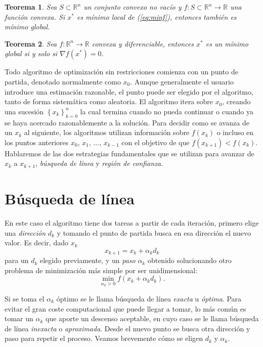 \documentclass[11pt,a4paper]{book}
\newtheorem{theorem}{Teorema}[chapter]
\theoremstyle{definition}
\theoremstyle{remark}
\newcommand{\sucesionxk}{\left\{x_k\right\}}
\begin{document}
\begin{theorem}
	Sea $S \subset \mathbb{R}^n$ un conjunto convexo no vacío y
	$f:S \subset \mathbb{R}^n \rightarrow \mathbb{R}$ una función convexa. Si $x^*$ es mínimo local de (\ref{eq:minf}), entonces también es mínimo global.
\end{theorem}

\begin{theorem} \label{th:convx}
	Sea $f: \mathbb{R}^n \rightarrow \mathbb{R}$ convexa y diferenciable, entonces $x^*$ es un mínimo global si y solo si $\nabla f(x^*) = 0$.
\end{theorem}

Todo algoritmo de optimización sin restricciones comienza con un punto de partida, denotado normalmente como $x_{0}$. Aunque generalmente el usuario introduce una estimación razonable, el punto puede ser elegido por el algoritmo, tanto de forma sistemática como aleatoria. El algoritmo itera sobre $x_{0}$, creando una sucesión $\sucesionxk_{k=0}^n$ la cual termina cuando no pueda continuar o cuando ya se haya acercado razonablemente a la solución. Para decidir como se avanza de un $x_k$ al siguiente, los algoritmos utilizan información sobre $f(x_k)$ o incluso en los puntos anteriores $x_0,\, x_1,\, \ldots,\,x_{k-1}$ con el objetivo de que $f(x_{k+1})<f(x_{k})$. Hablaremos de las dos estrategias fundamentales que se utilizan para avanzar de $x_k$ a $x_{k+1}$, \textit{búsqueda de línea} y \textit{región de confianza}.

\section{Búsqueda de línea}

En este caso el algoritmo tiene dos tareas a partir de cada iteración, primero elige una \textit{dirección} $d_k$ y tomando el punto de partida busca en esa dirección el nuevo valor. Es decir, dado $x_k$
\begin{equation}
	x_{k+1} = x_k + \alpha_kd_k
\end{equation}
para un $d_k$ elegido previamente, y un \textit{paso} $\alpha_k$ obtenido solucionando otro problema de minimización más simple por ser unidimensional:
\begin{equation}
	\min_{\alpha_k>0}f\left(x_k+\alpha_kd_k\right).
	\label{min:alphak}
\end{equation}

Si se toma el $\alpha_k$ óptimo se le llama búsqueda de línea \textit{exacta} u \textit{óptima}. Para evitar el gran coste computacional que puede llegar a tomar, lo más común es tomar un $\alpha_k$ que aporte un descenso aceptable, en cuyo caso se le llama búsqueda de línea \textit{inexacta} o \textit{aproximada}. Desde el nuevo punto se busca otra dirección y paso para repetir el proceso.
Veamos brevemente cómo se eligen $d_k$ y $\alpha_k$.
\end{document}
